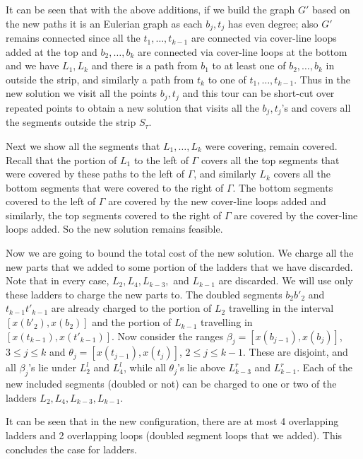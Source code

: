\documentclass[10pt,a4paper]{amsart}
\theoremstyle{thmstyleone}
\begin{document}
    It can be seen that with the above additions, if we build the graph $G'$ based on the new paths it is an Eulerian graph as each $b_j,t_j$ has even degree; also $G'$ remains connected since
    all the $t_1,\ldots,t_{k-1}$ are connected via cover-line loops added at the top and $b_2,\ldots,b_k$ are connected via cover-line loops at the bottom and we have $L_1,L_k$ and there is a path from $b_1$ to at least one of $b_2,\ldots,b_k$ in outside the strip, and similarly a path from $t_k$ to one of $t_1,\ldots,t_{k-1}$. Thus in the new solution we visit all the points $b_j,t_j$ and this tour can be short-cut over repeated points to obtain a new solution that visits all the $b_j,t_j$'s and covers all the segments outside the strip $S_\tau$. 

    Next we show all the segments that $L_1,\ldots,L_k$ were covering, remain covered. Recall that the portion of $L_1$ to the left of $\Gamma$ covers all the top segments that were covered by these paths to the left of $\Gamma$, and similarly $L_k$ covers all the bottom segments that were covered to the right of $\Gamma$. The bottom segments covered to the left of $\Gamma$ are covered by the 
    new cover-line loops added and similarly, the top segments covered to the right of $\Gamma$ are covered by the cover-line loops added. So the new solution remains feasible.
    
    Now we are going to bound the total cost of the new solution. We charge all the new parts that we added to some portion of the ladders that we have discarded. Note that in every case, $L_2, L_4, L_{k - 3},$ and $L_{k - 1}$ are discarded. We will use only these ladders to charge the new parts to.
    The doubled segments $b_2b'_2$ and $t_{k - 1}t'_{k - 1}$ are already charged to the portion of $L_2$ travelling in the interval $[x(b'_2), x(b_2)]$ and the portion of $L_{k - 1}$ travelling in $[x(t_{k - 1}), x(t'_{k - 1})]$. 
    Now consider the ranges $\beta_j = [x(b_{j - 1}), x(b_{j})]$, $3\leq j\leq k$ and $\theta_j = [x(t_{j - 1}), x(t_{j})]$, $2\leq j\leq k - 1$. These are disjoint, and all $\beta_j$'s lie under $L^l_2$ and $L^l_4$, while all $\theta_j$'s lie above $L^r_{k-3}$ and $L^r_{k-1}$. 
    Each of the new included segments (doubled or not) can be charged to one or two of the ladders $L_2, L_4, L_{k-3}, L_{k - 1}$.

    It can be seen that in the new configuration, there are at most 4 overlapping ladders and 2 overlapping loops (doubled segment loops that we added). This concludes the case for ladders.
\end{document}
